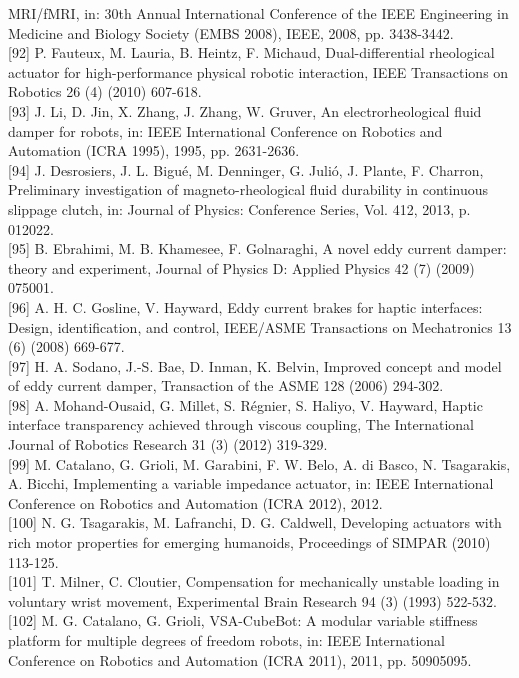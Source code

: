 \documentclass[10pt]{article}
\begin{document}
MRI/fMRI, in: 30th Annual International Conference of the IEEE Engineering in Medicine and Biology Society (EMBS 2008), IEEE, 2008, pp. 3438-3442.\\[0pt]
[92] P. Fauteux, M. Lauria, B. Heintz, F. Michaud, Dual-differential rheological actuator for high-performance physical robotic interaction, IEEE Transactions on Robotics 26 (4) (2010) 607-618.\\[0pt]
[93] J. Li, D. Jin, X. Zhang, J. Zhang, W. Gruver, An electrorheological fluid damper for robots, in: IEEE International Conference on Robotics and Automation (ICRA 1995), 1995, pp. 2631-2636.\\[0pt]
[94] J. Desrosiers, J. L. Bigué, M. Denninger, G. Julió, J. Plante, F. Charron, Preliminary investigation of magneto-rheological fluid durability in continuous slippage clutch, in: Journal of Physics: Conference Series, Vol. 412, 2013, p. 012022.\\[0pt]
[95] B. Ebrahimi, M. B. Khamesee, F. Golnaraghi, A novel eddy current damper: theory and experiment, Journal of Physics D: Applied Physics 42 (7) (2009) 075001.\\[0pt]
[96] A. H. C. Gosline, V. Hayward, Eddy current brakes for haptic interfaces: Design, identification, and control, IEEE/ASME Transactions on Mechatronics 13 (6) (2008) 669-677.\\[0pt]
[97] H. A. Sodano, J.-S. Bae, D. Inman, K. Belvin, Improved concept and model of eddy current damper, Transaction of the ASME 128 (2006) 294-302.\\[0pt]
[98] A. Mohand-Ousaid, G. Millet, S. Régnier, S. Haliyo, V. Hayward, Haptic interface transparency achieved through viscous coupling, The International Journal of Robotics Research 31 (3) (2012) 319-329.\\[0pt]
[99] M. Catalano, G. Grioli, M. Garabini, F. W. Belo, A. di Basco, N. Tsagarakis, A. Bicchi, Implementing a variable impedance actuator, in: IEEE International Conference on Robotics and Automation (ICRA 2012), 2012.\\[0pt]
[100] N. G. Tsagarakis, M. Lafranchi, D. G. Caldwell, Developing actuators with rich motor properties for emerging humanoids, Proceedings of SIMPAR (2010) 113-125.\\[0pt]
[101] T. Milner, C. Cloutier, Compensation for mechanically unstable loading in voluntary wrist movement, Experimental Brain Research 94 (3) (1993) 522-532.\\[0pt]
[102] M. G. Catalano, G. Grioli, VSA-CubeBot: A modular variable stiffness platform for multiple degrees of freedom robots, in: IEEE International Conference on Robotics and Automation (ICRA 2011), 2011, pp. 50905095.\\[0pt]
\end{document}
